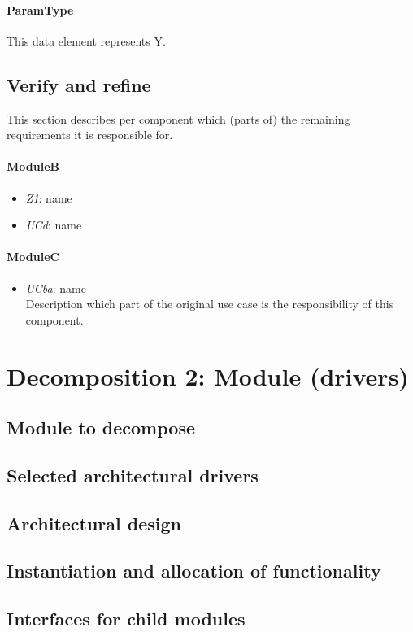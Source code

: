 \documentclass[english]{sareport}
\begin{document}
\paragraph{ParamType} This data element represents Y.

\subsection{Verify and refine}
This section describes per component which (parts of) the remaining
requirements it is responsible for.

\paragraph{ModuleB}
\begin{itemize}
	\item \emph{Z1}: name
	\item \emph{UCd}: name
\end{itemize}

\paragraph{ModuleC}
\begin{itemize}
	\item \emph{UCba}: name\\Description which part of the original use case is
	the responsibility of this component.
\end{itemize}

\section{Decomposition 2: Module (drivers)}
\subsection{Module to decompose}
\subsection{Selected architectural drivers}
\subsection{Architectural design}
\subsection{Instantiation and allocation of functionality}
\subsection{Interfaces for child modules}
\end{document}

